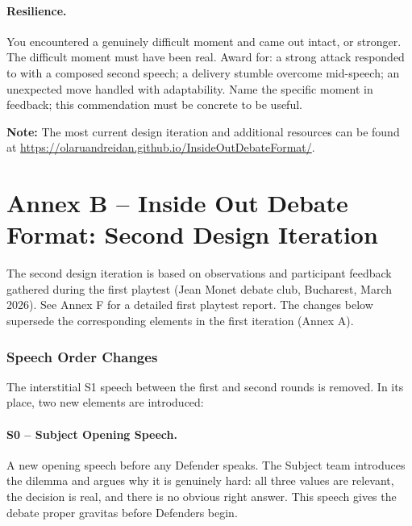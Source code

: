 \paragraph{Resilience.} You encountered a genuinely difficult moment and came out intact, or stronger. The difficult moment must have been real. Award for: a strong attack responded to with a composed second speech; a delivery stumble overcome mid-speech; an unexpected move handled with adaptability. Name the specific moment in feedback; this commendation must be concrete to be useful.


\medskip

\noindent\textbf{Note:} The most current design iteration and additional resources can be found at \url{https://olaruandreidan.github.io/InsideOutDebateFormat/}.


\newpage
\section*{Annex B -- Inside Out Debate Format: Second Design Iteration}

The second design iteration is based on observations and participant feedback gathered during the first playtest (Jean Monet debate club, Bucharest, March 2026). See Annex F for a detailed first playtest report. The changes below supersede the corresponding elements in the first iteration (Annex A).

\subsubsection{Speech Order Changes}

The interstitial S1 speech between the first and second rounds is removed. In its place, two new elements are introduced:

\paragraph{S0 -- Subject Opening Speech.} A new opening speech before any Defender speaks. The Subject team introduces the dilemma and argues why it is genuinely hard: all three values are relevant, the decision is real, and there is no obvious right answer. This speech gives the debate proper gravitas before Defenders begin.

